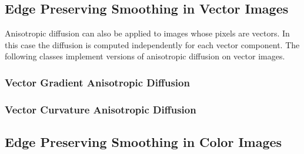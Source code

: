 \subsection{Edge Preserving Smoothing in Vector Images}
\label{sec:VectorAnisotropicDiffusion}

Anisotropic diffusion can also be applied to images whose pixels are vectors.
In this case the diffusion is computed independently for each vector component.
The following classes implement versions of anisotropic diffusion on vector images.


\subsubsection{Vector Gradient Anisotropic Diffusion}
\label{sec:VectorGradientAnisotropicDiffusionImageFilter}







\subsubsection{Vector Curvature Anisotropic Diffusion}
\label{sec:VectorCurvatureAnisotropicDiffusionImageFilter}





\subsection{Edge Preserving Smoothing in Color Images}
\label{sec:ColoAnisotropicDiffusion}





